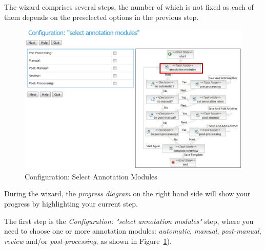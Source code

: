 The wizard comprises several steps, the number of which is not fixed as
each of them depends on the preselected options in the previous step.

\begin{figure}[htb]
\centering
\includegraphics[scale=0.4]{selectannotationmodes}
\caption{Configuration: Select Annotation Modules}
\label{fig:selectannotationmodes}
\end{figure}

During the wizard, the \emph{progress diagram} on the right hand side will
show your progress by highlighting your current step.

The first step is the \emph{Configuration: "select annotation modules"} step,
where you need to choose one or more annotation modules: \emph{automatic},
\emph{manual}, \emph{post-manual}, \emph{review} and/or
\emph{post-processing}, as shown in Figure~\ref{fig:selectannotationmodes}).

